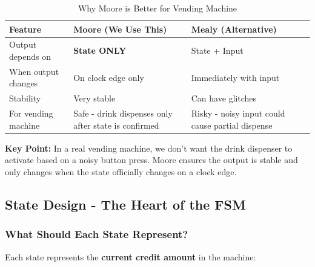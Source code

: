 \documentclass[12pt,a4paper]{article}
\begin{document}
\begin{table}[H]
    \centering
    \begin{tabular}{|p{4cm}|p{5cm}|p{5cm}|}
        \hline
        \textbf{Feature} & \textbf{Moore (We Use This)} & \textbf{Mealy (Alternative)} \\
        \hline
        Output depends on & \textbf{State ONLY} & State + Input \\
        \hline
        When output changes & On clock edge only & Immediately with input \\
        \hline
        Stability & Very stable & Can have glitches \\
        \hline
        For vending machine & Safe - drink dispenses only after state is confirmed & Risky - noisy input could cause partial dispense \\
        \hline
    \end{tabular}
    \caption{Why Moore is Better for Vending Machine}
\end{table}

\textbf{Key Point:} In a real vending machine, we don't want the drink dispenser to activate based on a noisy button press. Moore ensures the output is stable and only changes when the state officially changes on a clock edge.

\subsection{State Design - The Heart of the FSM}

\subsubsection{What Should Each State Represent?}

Each state represents the \textbf{current credit amount} in the machine:
\end{document}
